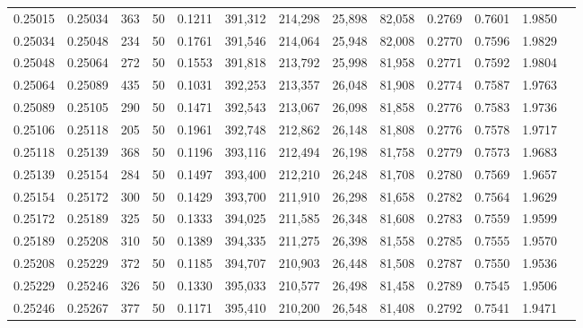 \begin{tabular}{rrrrrrrrrrrrr}
0.25015 & 0.25034 &   363 &  50 &                                     0.1211 & 391,312 & 214,298 &  25,898 &  82,058 & 0.2769 & 0.7601 & 1.9850 \\
0.25034 & 0.25048 &   234 &  50 &                                     0.1761 & 391,546 & 214,064 &  25,948 &  82,008 & 0.2770 & 0.7596 & 1.9829 \\
0.25048 & 0.25064 &   272 &  50 &                                     0.1553 & 391,818 & 213,792 &  25,998 &  81,958 & 0.2771 & 0.7592 & 1.9804 \\
0.25064 & 0.25089 &   435 &  50 &                                     0.1031 & 392,253 & 213,357 &  26,048 &  81,908 & 0.2774 & 0.7587 & 1.9763 \\
0.25089 & 0.25105 &   290 &  50 &                                     0.1471 & 392,543 & 213,067 &  26,098 &  81,858 & 0.2776 & 0.7583 & 1.9736 \\
0.25106 & 0.25118 &   205 &  50 &                                     0.1961 & 392,748 & 212,862 &  26,148 &  81,808 & 0.2776 & 0.7578 & 1.9717 \\
0.25118 & 0.25139 &   368 &  50 &                                     0.1196 & 393,116 & 212,494 &  26,198 &  81,758 & 0.2779 & 0.7573 & 1.9683 \\
0.25139 & 0.25154 &   284 &  50 &                                     0.1497 & 393,400 & 212,210 &  26,248 &  81,708 & 0.2780 & 0.7569 & 1.9657 \\
0.25154 & 0.25172 &   300 &  50 &                                     0.1429 & 393,700 & 211,910 &  26,298 &  81,658 & 0.2782 & 0.7564 & 1.9629 \\
0.25172 & 0.25189 &   325 &  50 &                                     0.1333 & 394,025 & 211,585 &  26,348 &  81,608 & 0.2783 & 0.7559 & 1.9599 \\
0.25189 & 0.25208 &   310 &  50 &                                     0.1389 & 394,335 & 211,275 &  26,398 &  81,558 & 0.2785 & 0.7555 & 1.9570 \\
0.25208 & 0.25229 &   372 &  50 &                                     0.1185 & 394,707 & 210,903 &  26,448 &  81,508 & 0.2787 & 0.7550 & 1.9536 \\
0.25229 & 0.25246 &   326 &  50 &                                     0.1330 & 395,033 & 210,577 &  26,498 &  81,458 & 0.2789 & 0.7545 & 1.9506 \\
0.25246 & 0.25267 &   377 &  50 &                                     0.1171 & 395,410 & 210,200 &  26,548 &  81,408 & 0.2792 & 0.7541 & 1.9471 \\

\end{tabular}
